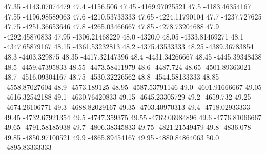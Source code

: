           47.35   -4143.07074479
           47.4        -4156.506
          47.45   -4169.97025521
           47.5   -4183.46354167
          47.55   -4196.98589063
           47.6   -4210.53733333
          47.65   -4224.11790104
           47.7     -4237.727625
          47.75   -4251.36653646
           47.8   -4265.03466667
          47.85   -4278.73204688
           47.9   -4292.45870833
          47.95   -4306.21468229
           48.0          -4320.0
          48.05   -4333.81469271
           48.1   -4347.65879167
          48.15   -4361.53232813
           48.2   -4375.43533333
          48.25   -4389.36783854
           48.3     -4403.329875
          48.35   -4417.32147396
           48.4   -4431.34266667
          48.45   -4445.39348438
           48.5   -4459.47395833
          48.55   -4473.58411979
           48.6        -4487.724
          48.65   -4501.89363021
           48.7   -4516.09304167
          48.75   -4530.32226562
           48.8   -4544.58133333
          48.85   -4558.87027604
           48.9     -4573.189125
          48.95   -4587.53791146
           49.0   -4601.91666667
          49.05   -4616.32542188
           49.1   -4630.76420833
          49.15   -4645.23305729
           49.2        -4659.732
          49.25   -4674.26106771
           49.3   -4688.82029167
          49.35   -4703.40970313
           49.4   -4718.02933333
          49.45   -4732.67921354
           49.5     -4747.359375
          49.55   -4762.06984896
           49.6   -4776.81066667
          49.65   -4791.58185938
           49.7   -4806.38345833
          49.75   -4821.21549479
           49.8        -4836.078
          49.85   -4850.97100521
           49.9   -4865.89454167
          49.95   -4880.84864063
           50.0   -4895.83333333
